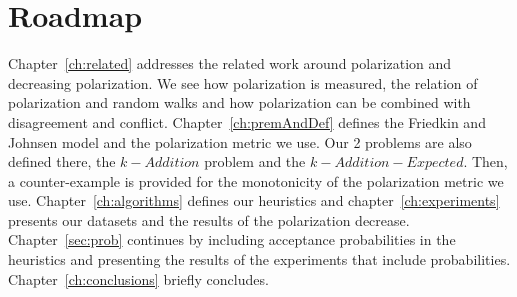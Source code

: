 \section{Roadmap}
\label{sec:roadmap}

Chapter~\ref{ch:related} addresses the related work around polarization and decreasing polarization. We see how polarization is measured, the relation of polarization and random walks and how polarization can be combined with disagreement and conflict. Chapter~\ref{ch:premAndDef} defines the Friedkin and Johnsen model and the polarization metric we use. Our 2 problems are also defined there, the $k-Addition$ problem and the $k-Addition-Expected$. Then, a counter-example is provided for the monotonicity of the polarization metric we use. Chapter~\ref{ch:algorithms}  defines our heuristics and chapter~\ref{ch:experiments} presents our datasets and the results of the polarization decrease. Chapter~\ref{sec:prob} continues by including acceptance probabilities in the heuristics and presenting the results of the experiments that include probabilities.  Chapter~\ref{ch:conclusions} briefly concludes.





